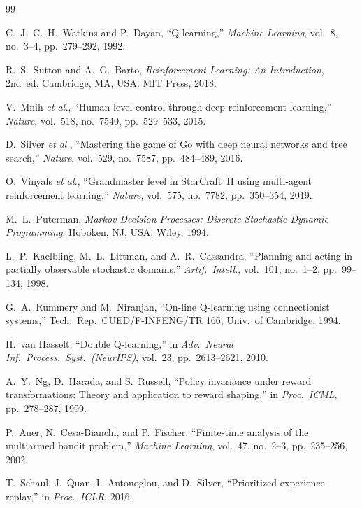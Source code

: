 \documentclass[10pt,conference]{IEEEtran}
\begin{document}

\begin{thebibliography}{99}

C.~J.~C.~H.\ Watkins and P.\ Dayan,
``Q-learning,''
\emph{Machine Learning}, vol.~8, no.~3--4, pp.~279--292, 1992.

R.~S.\ Sutton and A.~G.\ Barto,
\emph{Reinforcement Learning: An Introduction}, 2nd~ed.
Cambridge, MA, USA: MIT Press, 2018.

V.~Mnih \emph{et al.},
``Human-level control through deep reinforcement learning,''
\emph{Nature}, vol.~518, no.~7540, pp.~529--533, 2015.

D.~Silver \emph{et al.},
``Mastering the game of Go with deep neural networks and tree search,''
\emph{Nature}, vol.~529, no.~7587, pp.~484--489, 2016.

O.~Vinyals \emph{et al.},
``Grandmaster level in StarCraft~II using multi-agent reinforcement
learning,''
\emph{Nature}, vol.~575, no.~7782, pp.~350--354, 2019.

M.~L.\ Puterman,
\emph{Markov Decision Processes: Discrete Stochastic Dynamic Programming}.
Hoboken, NJ, USA: Wiley, 1994.

L.~P.\ Kaelbling, M.~L.\ Littman, and A.~R.\ Cassandra,
``Planning and acting in partially observable stochastic domains,''
\emph{Artif.\ Intell.}, vol.~101, no.~1--2, pp.~99--134, 1998.

G.~A.\ Rummery and M.\ Niranjan,
``On-line Q-learning using connectionist systems,''
Tech.\ Rep.\ CUED/F-INFENG/TR 166, Univ.\ of Cambridge, 1994.

H.~van Hasselt,
``Double Q-learning,''
in \emph{Adv.\ Neural Inf.\ Process.\ Syst.\ (NeurIPS)},
vol.~23, pp.~2613--2621, 2010.

A.~Y.\ Ng, D.\ Harada, and S.\ Russell,
``Policy invariance under reward transformations: Theory and application
to reward shaping,''
in \emph{Proc.\ ICML}, pp.~278--287, 1999.

P.~Auer, N.\ Cesa-Bianchi, and P.\ Fischer,
``Finite-time analysis of the multiarmed bandit problem,''
\emph{Machine Learning}, vol.~47, no.~2--3, pp.~235--256, 2002.

T.~Schaul, J.\ Quan, I.\ Antonoglou, and D.\ Silver,
``Prioritized experience replay,''
in \emph{Proc.\ ICLR}, 2016.


\end{thebibliography}
\end{document}

